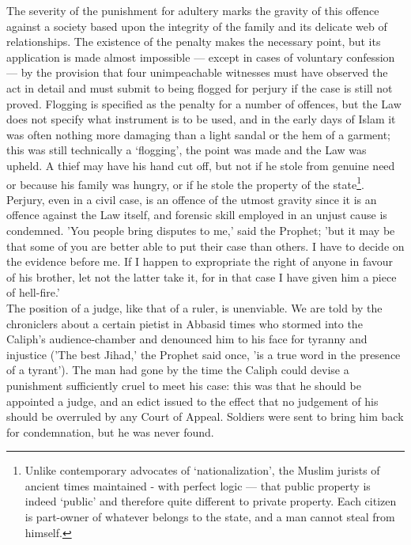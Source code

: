 \documentclass[10pt, twoside,openright]{book}
\begin{document}
The severity of the punishment for adultery marks the gravity of this offence against a society based 
upon the integrity of the family and its delicate web of relationships. The existence of the penalty 									
makes the necessary point, but its application is made almost impossible --- except in cases of 
voluntary confession --- by the provision that four unimpeachable witnesses must have observed the act in 
detail and must submit to being flogged for perjury if the case is still not proved. Flogging is 
specified as the penalty for a number of offences, but the Law does not specify what instrument is to 
be used, and in the early days of Islam it was often nothing more damaging than a light sandal or the 
hem of a garment; this was still technically a `flogging', the point was made and the Law was upheld. 
A thief may have his hand cut off, but not if he stole from genuine need or because his family was 
hungry, or if he stole the property of the state\footnote{Unlike contemporary advocates of `nationalization', the Muslim jurists of ancient times maintained 
- with perfect logic --- that public property is indeed `public' and therefore quite different to 
private property. Each citizen is part\hyp{}owner of whatever belongs to the state, and a man cannot steal 
from himself.}. \\

Perjury, even in a civil case, is an offence of the utmost gravity since it is an offence against the 
Law itself, and forensic skill employed in an unjust cause is condemned. 'You people bring disputes 
to me,' said the Prophet; 'but it may be that some of you are better able to put their case than 
others. I have to decide on the evidence before me. If I happen to expropriate the right of anyone in 
favour of his brother, let not the latter take it, for in that case I have given him a piece of 
hell-fire.' \\

The position of a judge, like that of a ruler, is unenviable. We are told by the chroniclers about a 
certain pietist in Abbasid times who stormed into the Caliph's audience\hyp{}chamber and denounced him to 
his face for tyranny and injustice ('The best Jihad,' the Prophet said once, 'is a true word in the 
presence of a tyrant'). The man had gone by the time the Caliph could devise a punishment 
sufficiently cruel to meet his case: this was that he should be appointed a judge, and an edict 
issued to the effect that no judgement of his should be overruled by any Court of Appeal. Soldiers 
were sent to bring him back for condemnation, but he was never found. \\
\end{document}
